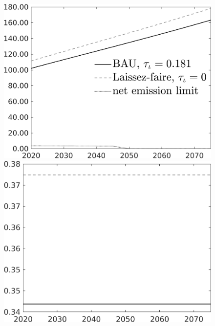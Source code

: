 \documentclass[12pt]{article}
\begin{document}
\begin{figure}[h!!]
	\begin{minipage}[]{0.32\textwidth}
		\includegraphics[width=1\textwidth]{../../codding_model/own_basedOnFried/optimalPol_010922_revision/figures/all_13Sept22/CompTaul_Equlab_LFBAU_Reg0_Emnet_spillover0_nsk1_xgr1_knspil1_sep1_countec0_GovRev0_etaa0.79_lgd1.png}
	\end{minipage}	
	\begin{minipage}[]{0.32\textwidth}
		\includegraphics[width=1\textwidth]{../../codding_model/own_basedOnFried/optimalPol_010922_revision/figures/all_13Sept22/CompTaul_Equlab_LFBAU_Reg0_hh_spillover0_nsk1_xgr1_knspil1_sep1_countec0_GovRev0_etaa0.79_lgd0.png}

\end{minipage}
\end{figure}
\end{document}

